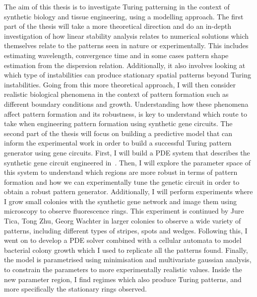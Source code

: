 The aim of this thesis is to investigate Turing patterning in the context of synthetic biology and tissue engineering, using a modelling approach.
The first part of the thesis will take a more theoretical direction and do an in-depth investigation of how linear stability analysis relates to numerical solutions which themselves relate to the patterns seen in nature or experimentally.
This includes estimating wavelength, convergence time and in some cases pattern shape estimation from the dispersion relation.
Additionally, it also involves looking at which type of instabilities can produce stationary spatial patterns beyond Turing instabilities.
Going from this more theoretical approach, I will then consider realistic biological phenomena in the context of pattern formation such as different boundary conditions and growth.
Understanding how these phenomena affect pattern formation and its robustness, is key to understand which route to take when engineering pattern formation using synthetic gene circuits.
The second part of the thesis will focus on building a predictive model that can inform the experimental work in order to build a successful Turing pattern generator using gene circuits.
First, I will build a PDE system that describes the synthetic gene circuit engineered in~\parencite{Tica2020}.
Then, I will explore the parameter space of this system to understand which regions are more robust in terms of pattern formation and how we can experimentally tune the genetic circuit in order to obtain a robust pattern generator.
Additionally, I will perform experiments where I grow small colonies with the synthetic gene network and image them using microscopy to observe fluorescence rings.
This experiment is continued by Jure Tica, Tong Zhu, Georg Wachter in larger colonies to observe a wide variety of patterns, including different types of stripes, spots and wedges.
Following this, I went on to develop a PDE solver combined with a cellular automata to model bacterial colony growth which I used to replicate all the patterns found.
Finally, the model is parametrised using minimisation and multivariate gaussian analysis, to constrain the parameters to more experimentally realistic values.
Inside the new parameter region, I find regimes which also produce Turing patterns, and more specifically the stationary rings observed.


